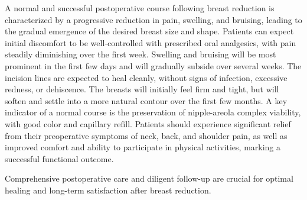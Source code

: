 A normal and successful postoperative course following breast reduction is characterized by a progressive reduction in pain, swelling, and bruising, leading to the gradual emergence of the desired breast size and shape. Patients can expect initial discomfort to be well-controlled with prescribed oral analgesics, with pain steadily diminishing over the first week. Swelling and bruising will be most prominent in the first few days and will gradually subside over several weeks. The incision lines are expected to heal cleanly, without signs of infection, excessive redness, or dehiscence. The breasts will initially feel firm and tight, but will soften and settle into a more natural contour over the first few months. A key indicator of a normal course is the preservation of nipple-areola complex viability, with good color and capillary refill. Patients should experience significant relief from their preoperative symptoms of neck, back, and shoulder pain, as well as improved comfort and ability to participate in physical activities, marking a successful functional outcome.

Comprehensive postoperative care and diligent follow-up are crucial for optimal healing and long-term satisfaction after breast reduction.

